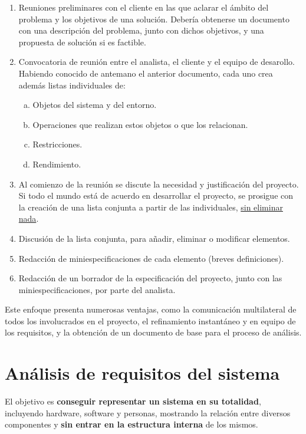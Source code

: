 \begin{enumerate}
    \item Reuniones preliminares con el cliente en las que aclarar el ámbito del problema y los objetivos de una solución. Debería obtenerse un documento con una descripción del problema, junto con dichos objetivos, y una propuesta de solución si es factible.
    \item Convocatoria de reunión entre el analista, el cliente y el equipo de desarollo. Habiendo conocido de antemano el anterior documento, cada uno crea además listas individuales de:
        \begin{enumerate}[a.]
            \item Objetos del sistema y del entorno.
            \item Operaciones que realizan estos objetos o que los relacionan.
            \item Restricciones.
            \item Rendimiento.
        \end{enumerate}
    \item Al comienzo de la reunión se discute la necesidad y justificación del proyecto. Si todo el mundo está de acuerdo en desarrollar el proyecto, se prosigue con la creación de una lista conjunta a partir de las individuales, \uline{sin eliminar nada}.
    \item Discusión de la lista conjunta, para añadir, eliminar o modificar elementos.
    \item Redacción de miniespecificaciones de cada elemento (breves definiciones).
    \item Redacción de un borrador de la especificación del proyecto, junto con las miniespecificaciones, por parte del analista.
\end{enumerate}

Este enfoque presenta numerosas ventajas, como la comunicación multilateral de todos los involucrados en el proyecto, el refinamiento instantáneo y en equipo de los requisitos, y la obtención de un documento de base para el proceso de análisis.


\section{Análisis de requisitos del sistema}

El objetivo es \textbf{conseguir representar un sistema en su totalidad}, incluyendo hardware, software y personas, mostrando la relación entre diversos componentes y \textbf{sin entrar en la estructura interna} de los mismos.\\

